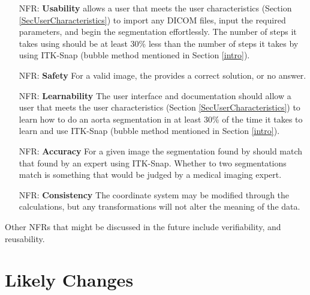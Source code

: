 \documentclass[12pt]{article}
\newcounter{nfrnum} %
\begin{document}
\noindent \begin{itemize}

\item[NFR\refstepcounter{nfrnum}\thenfrnum \label{NFR_Usability}:] \textbf{Usability}
\progname{} allows a user that meets the user characteristics (Section \ref{SecUserCharacteristics})  to import any DICOM files, input the required parameters, and begin the segmentation effortlessly. The number of steps it takes using \progname{} should be at least 30\% less than the number of steps it takes by using ITK-Snap  (bubble method mentioned in Section \ref{intro}).

\item[NFR\refstepcounter{nfrnum}\thenfrnum \label{NFR_Safety}:] \textbf{Safety}
For a valid image, the \progname{} provides a correct solution, or no answer.

\item[NFR\refstepcounter{nfrnum}\thenfrnum \label{NFR_Learnability}:] \textbf{Learnability}
The user interface and documentation should allow a user that meets the user characteristics (Section \ref{SecUserCharacteristics}) to learn how to do an aorta segmentation in at least 30\% of the time it takes to learn and use ITK-Snap (bubble method mentioned in Section \ref{intro}).

\item[NFR\refstepcounter{nfrnum}\thenfrnum \label{NFR_Accuracy}:] \textbf{Accuracy}
For a given image the segmentation found by \progname{} should match that found by an expert using ITK-Snap. Whether to two segmentations match is something that would be judged by a medical imaging expert.

\item[NFR\refstepcounter{nfrnum}\thenfrnum \label{NFR_Consistency}:] \textbf{Consistency}
The coordinate system may be modified through the calculations, but any transformations will not alter the meaning of the data.


\end{itemize}


\noindent Other NFRs that might be discussed in the future include verifiability, and reusability.

\section{Likely Changes}    
\end{document}
